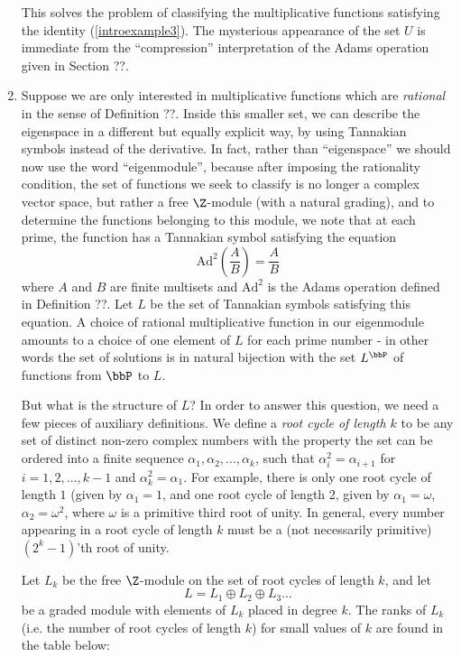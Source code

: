 \documentclass[a4paper]{article}
\begin{document}
\begin{example}
\begin{enumerate}
This solves the problem of classifying the multiplicative functions satisfying the identity (\ref{introexample3}). The mysterious appearance of the set $U$ is immediate from the ``compression'' interpretation of the Adams operation given in Section ??.


\item Suppose we are only interested in multiplicative functions which are \emph{rational} in the sense of Definition ??. Inside this smaller set, we can describe the eigenspace in a different but equally explicit way, by using Tannakian symbols instead of the derivative. In fact, rather than ``eigenspace'' we should now use the word ``eigenmodule'', because after imposing the rationality condition, the set of functions we seek to classify is no longer a complex vector space, but rather a free $\Z$-module (with a natural grading), and to determine the functions belonging to this module, we note that at each prime, the function has a Tannakian symbol satisfying the equation 
$$   \text{Ad}^2(\frac{A}{B}) = \frac{A}{B}   $$
where $A$ and $B$ are finite multisets and $\text{Ad}^2$ is the Adams operation defined in Definition ??. Let $L$ be the set of Tannakian symbols satisfying this equation. A choice of rational multiplicative function in our eigenmodule amounts to a choice of one element of $L$ for each prime number - in other words the set of solutions is in natural bijection with the set $L^{\bbP}$ of functions from $\bbP$ to $L$. 

But what is the structure of $L$? In order to answer this question, we need a few pieces of auxiliary definitions. We define a \emph{root cycle of length $k$} to be any set of distinct non-zero complex numbers with the property the set can be ordered into a finite sequence $\alpha_1, \alpha_2, \ldots, \alpha_k$, such that $\alpha_i^2 = \alpha_{i+1}$ for $i = 1, 2, \ldots, k-1$ and $\alpha_k^2 = \alpha_1$. For example, there is only one root cycle of length $1$ (given by $\alpha_1 = 1$, and one root cycle of length 2, given by $\alpha_1 = \omega$, $\alpha_2 = \omega^2$, where $\omega$ is a primitive third root of unity. In general, every number appearing in a root cycle of length $k$ must be a (not necessarily primitive) $(2^k-1)$'th root of unity.

 Let $L_k$ be the free $\Z$-module on the set of root cycles of length $k$, and let 
$$  L = L_1 \oplus L_2 \oplus L_3 \ldots   $$
be a graded module with elements of $L_k$ placed in degree $k$. The ranks of $L_k$ (i.e. the number of root cycles of length $k$) for small values of $k$ are found in the table below:


\end{enumerate}
\end{example}
\end{document}
